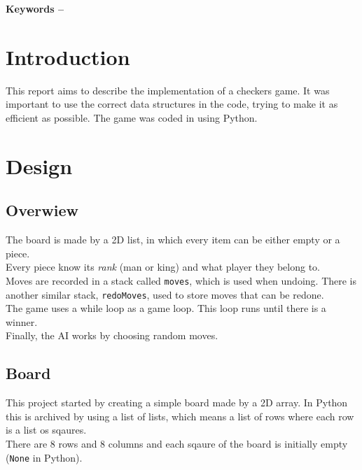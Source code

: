 \documentclass[10pt, a4paper]{article}
\title{\mytitle}
\author{\myauthor\hspace{1em}\\\contact\\Edinburgh Napier University\hspace{0.5em}-\hspace{0.5em}\mymodule}
\date{}
\begin{document}
    \maketitle
    \begin{abstract}
        The goal of this coursework is to implement the classic board game of checkers in an arbitrary computer language demonstrating a correct use of data structures. The language chosen here is Python and the game can be played from the console.
    \end{abstract}
    
    \textbf{Keywords -- }{\mykeywords}
    
    \section{Introduction}
    This report aims to describe the implementation of a checkers game. It was important to use the correct data structures in the code, trying to make it as efficient as possible. The game was coded in using Python.
       
    \section{Design}
    
    \subsection{Overwiew}
    The board is made by a 2D list, in which every item can be either empty or a piece. \\
    Every piece know its \textit{rank} (man or king) and what player they belong to. \\
    Moves are recorded in a stack called \texttt{moves}, which is used when undoing. There is another similar stack, \texttt{redoMoves}, used to store moves that can be redone. \\
    The game uses a while loop as a game loop. This loop runs until there is a winner. \\
    Finally, the AI works by choosing random moves.
    
    \subsection{Board}
    This project started by creating a simple board made by a 2D array. In Python this is archived by using a list of lists, which means a list of rows where each row is a list os sqaures. \\
    There are 8 rows and 8 columns and each sqaure of the board is initially empty (\texttt{None} in Python).
    
\end{document}
